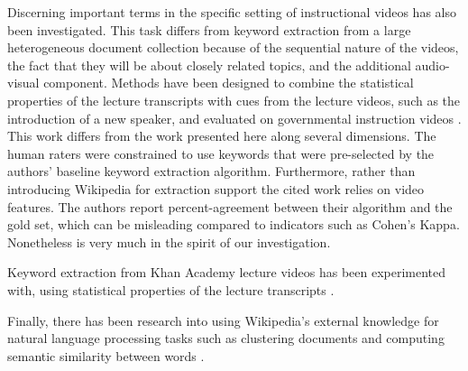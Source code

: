 Discerning important terms in the specific setting of instructional
videos has also been investigated. This task differs from keyword
extraction from a large heterogeneous document collection because of
the sequential nature of the videos, the fact that they will be about
closely related topics, and the additional audio-visual
component. Methods have been designed to combine the statistical
properties of the lecture transcripts with cues from the lecture
videos, such as the introduction of a new speaker, and evaluated on
governmental instruction videos \cite{park2006extracting}. This work
differs from the work presented here along several dimensions. The
human raters were constrained to use keywords that were pre-selected
by the authors' baseline keyword extraction algorithm. Furthermore,
rather than introducing Wikipedia for extraction support the cited
work relies on video features. The authors report percent-agreement
between their algorithm and the gold set, which can be misleading
compared to indicators such as Cohen's Kappa. Nonetheless
\cite{park2006extracting} is very much in the spirit of our
investigation. 

Keyword extraction from Khan Academy lecture videos has been
experimented with, using statistical properties of the lecture
transcripts \cite{6337092}.

Finally, there has been research into using Wikipedia's external knowledge for natural language processing tasks such as clustering documents \cite{hu2009exploiting} and computing semantic similarity between words \cite{milne2007computing}.
